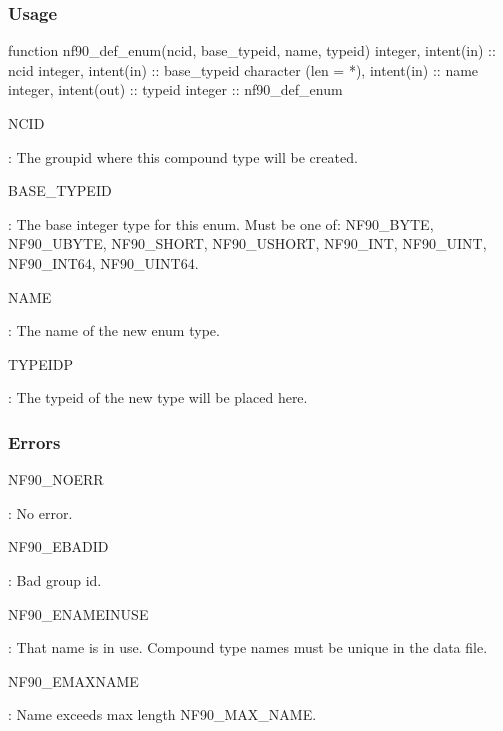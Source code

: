 \subsubsection*{Usage}


\begin{DoxyCode}
\textcolor{keyword}{function }nf90\_def\_enum(ncid, base\_typeid, name, typeid)
  \textcolor{keywordtype}{integer}, \textcolor{keywordtype}{intent(in)} :: ncid
  \textcolor{keywordtype}{integer}, \textcolor{keywordtype}{intent(in)} :: base\_typeid
  \textcolor{keywordtype}{character (len = *)}, \textcolor{keywordtype}{intent(in)} :: name
  \textcolor{keywordtype}{integer}, \textcolor{keywordtype}{intent(out)} :: typeid
  \textcolor{keywordtype}{integer} :: nf90\_def\_enum
\end{DoxyCode}


{\ttfamily N\+C\+ID}

\+: The groupid where this compound type will be created.

{\ttfamily B\+A\+S\+E\+\_\+\+T\+Y\+P\+E\+ID}

\+: The base integer type for this enum. Must be one of\+: N\+F90\+\_\+\+B\+Y\+TE, N\+F90\+\_\+\+U\+B\+Y\+TE, N\+F90\+\_\+\+S\+H\+O\+RT, N\+F90\+\_\+\+U\+S\+H\+O\+RT, N\+F90\+\_\+\+I\+NT, N\+F90\+\_\+\+U\+I\+NT, N\+F90\+\_\+\+I\+N\+T64, N\+F90\+\_\+\+U\+I\+N\+T64.

{\ttfamily N\+A\+ME}

\+: The name of the new enum type.

{\ttfamily T\+Y\+P\+E\+I\+DP}

\+: The typeid of the new type will be placed here.

\subsubsection*{Errors}

{\ttfamily N\+F90\+\_\+\+N\+O\+E\+RR}

\+: No error.

{\ttfamily N\+F90\+\_\+\+E\+B\+A\+D\+ID}

\+: Bad group id.

{\ttfamily N\+F90\+\_\+\+E\+N\+A\+M\+E\+I\+N\+U\+SE}

\+: That name is in use. Compound type names must be unique in the data file.

{\ttfamily N\+F90\+\_\+\+E\+M\+A\+X\+N\+A\+ME}

\+: Name exceeds max length N\+F90\+\_\+\+M\+A\+X\+\_\+\+N\+A\+ME.

